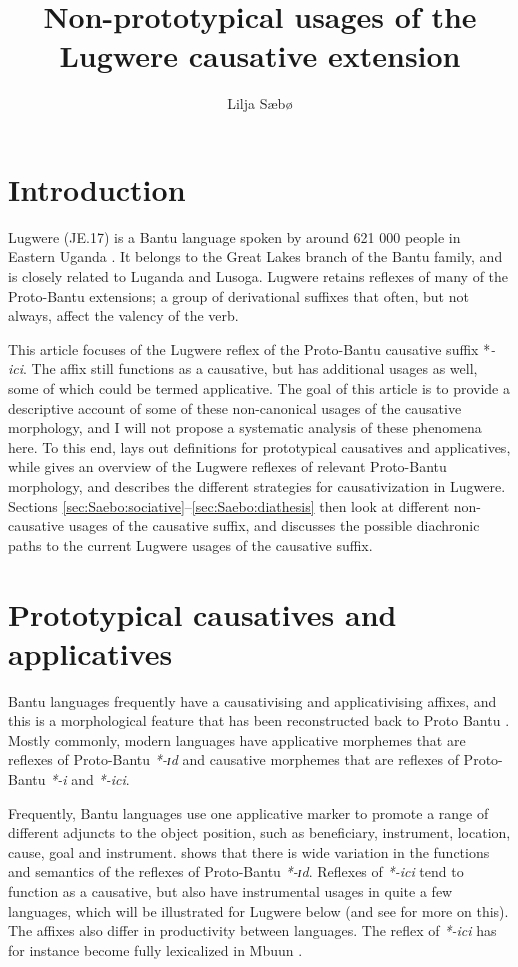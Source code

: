 \documentclass[output=paper,colorlinks,citecolor=brown,draftmode]{langscibook}
\author{Lilja Sæbø\affiliation{University of Oxford}}
\title{Non-prototypical usages of the Lugwere causative extension}
\begin{document}
\maketitle

\section{Introduction }

Lugwere (JE.17) is a Bantu language spoken by around 621 000 people in Eastern Uganda \citep{EthnologueSaebo}. It belongs to the Great Lakes branch of the Bantu family, and is closely related to Luganda and Lusoga. Lugwere retains reflexes of many of the Proto-Bantu extensions; a group of derivational suffixes that often, but not always, affect the valency of the verb.

This article focuses of the Lugwere reflex of the Proto-Bantu causative suffix *\textit{-ici}. The affix still functions as a causative, but has additional usages as well, some of which could be termed applicative. The goal of this article is to provide a descriptive account of some of these non-canonical usages of the causative morphology, and I will not propose a systematic analysis of these phenomena here. To this end,  lays out definitions for prototypical causatives and applicatives, while  gives an overview of the Lugwere reflexes of relevant Proto-Bantu morphology, and describes the different strategies for causativization in Lugwere. Sections \ref{sec:Saebo:sociative}--\ref{sec:Saebo:diathesis} then look at different non-causative usages of the causative suffix, and  discusses the possible diachronic paths to the current Lugwere usages of the causative suffix.

\section{Prototypical causatives and applicatives} \label{sec:Saebo:proto}

Bantu languages frequently have a causativising and applicativising affixes, and this is a morphological feature that has been reconstructed back to Proto Bantu \citep{schadeberg2019word}. Mostly commonly, modern languages have applicative morphemes that are reflexes of Proto-Bantu \emph{*-ɪd} and causative morphemes that are reflexes of Proto-Bantu \emph{*-i} and \emph{*-ici}.

Frequently, Bantu languages use one applicative marker to promote a range of different adjuncts to the object position, such as beneficiary, instrument, location, cause, goal and instrument. \citet{pacchiarotti2020bantu} shows that there is wide variation in the functions and semantics of the reflexes of Proto-Bantu \emph{*-ɪd}. Reflexes of \emph{*-ici} tend to function as a causative, but also have instrumental usages in quite a few languages, which will be illustrated for Lugwere below (and see  for more on this). The affixes also differ in productivity between languages. The reflex of \emph{*-ici} has for instance become fully lexicalized in Mbuun \citep{bostoen2011causative}. 
\end{document}
